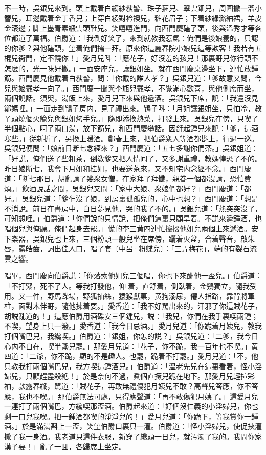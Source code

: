 不一時，吳銀兒來到。頭上戴着白縐紗䯼髻、珠子箍兒、翠雲鈿兒，周圍撇一溜小簪兒，耳邊戴着金丁香兒；上穿白綾對衿襖兒，粧花眉子；下着紗綠潞紬裙，羊皮金滚邊；脚上墨青素緞雲頭鞋兒。笑嘻嘻進門，向西門慶磕了頭，後與溫秀才等各位都道了萬福。伯爵道：「我倒好笑了，來到就教我惹氣：俺們是後娘養的，只認的你爹？與他磕頭，望着俺們擩一拜。原來你這麗春院小娘兒這等欺客！我若有五棍兒衙門，定不饒你！」愛月兒呌：「應花子，好沒羞的孩兒！那裏哥兒你行頭不怎麽的，光一味好撇。」一面安座兒，讓銀姐坐。就在西門慶桌邊坐下，連忙放鍾筯。西門慶見他戴着白䯼髻，問：「你戴的誰人孝？」吳銀兒道：「爹故意又問，今兒與娘戴孝一向了。」西門慶一聞與李瓶兒戴孝，不覺滿心歡喜，與他側席而坐，兩個說話。須臾，湯飯上來，愛月兒下來與他遞酒。吳銀兒下席，說：「我還沒見鄭媽哩。」一面走到鴇子房内，見了禮出來。鴇子呌：「月姐讓銀姐坐，只怕冷，教丫頭燒個火籠兒與銀姐烤手兒。」隨即添換熱菜，打發上來。吳銀兒在傍，只喫了半個點心，呵了兩口湯，放下筯兒，和西門慶攀話。因㧱起鍾兒來說：「爹，這酒寒些。」従新折了，另換上暖酒。鄭春上來，把伯爵衆人等酒都斟上，行過一巡。吳銀兒便問：「娘前日断七念經來？」西門慶道：「五七多謝你們茶。」吳銀姐道：「好説，俺們送了些粗茶，倒敎爹又把人情囘了，又多謝重禮，教媽惶恐了不的。昨日娘断七，我會下月姐和桂姐，也要送茶來，又不知宅内念經不念。」西門慶道：「断七那日，胡亂請了幾衆女僧，在家拜了拜懺，親眷一個都沒請，恐怕費煩。」飲酒說話之間，吳銀兒又問：「家中大娘、衆娘們都好？」西門慶道：「都好。」吳銀兒道：「爹乍沒了娘，到房裏孤孤兒的，心中也想？」西門慶道：「想是不消說。前日在書房中，白日夢見他，哭的我了不的。」吳銀兒道：「熱突突沒了，可知想哩。」伯爵道：「你們說的只情說，把俺們這裏只顧旱着。不説來遞鍾酒，也唱個兒與俺聽。俺們起身去罷。」慌的李三黄四連忙攛掇他姐兒兩個上來遞酒。安下楽器，吳銀兒也上來，三個粉頭一般兒坐在席傍，躧着火盆，合着聲音，啟朱唇，露皓齒，詞出佳人口，唱了套〔中呂·粉蝶兒〕：「三弄梅花」，端的有裂石流雲之響。

唱畢，西門慶向伯爵説：「你落索他姐兒三個唱，你也下來酬他一盃兒。」伯爵道：「不打緊，死不了人。等我打發他，仰𢵞着，直舒着，側臥着，金鷄獨立，隨我受用。又一件，野馬䠕場，野狐抽絲，猿猴獻菓，黄狗溺尿，僊人指路，靠背將軍柱，面對木伴哥，隨他揀着耍。」愛香道：「我不好駡出來的，汗邪了你這賊花子，胡説亂道的！」這應伯爵用酒碟安三個鍾兒，説：「我兒，你們在我手裏喫兩鍾；不喫，望身上只一潑。」愛香道：「我今日忌酒。」愛月兒道：「你跪着月姨兒，教我打個嘴巴兒，我纔喫。」伯爵道：「銀姐，你怎的説？」吳銀兒道：「二爹，我今日心内不自在，喫半盞兒罷。」那愛月兒道：「花子，你不跪，我一百年也不喫。」黄四道：「二爺，你不跪，顯的不是趣人。也罷，跪着不打罷。」愛月兒道：「不，他只教我打兩個嘴巴兒，我方喫這鍾酒兒。」伯爵道：「溫老先兒在這裏看着，怪小淫婦兒，只顧趕盡殺絶！」於是奈何不過，眞個直撅兒跪在地下。那愛月兒輕揎彩袖，款露春纖，駡道：「賊花子，再敢無禮傷犯月姨兒不敢？高聲兒答應，你不答應，我也不喫。」那伯爵無法可處，只得應聲道：「再不敢傷犯月姨了。」這愛月兒一連打了兩個嘴巴，方纔喫那盃酒。伯爵起來道：「好個沒仁義的小淫婦兒，你也剩一口兒我喫。把一鍾酒都喫的淨淨兒的！」愛月兒道：「你跪下，等我賞你一鍾酒。」於是滿滿斟上一盃，笑望伯爵口裏只一灌。伯爵道：「怪小淫婦兒，使促挾灌撒了我一身酒。我老道只這件衣服，新穿了纔頭一日兒，就汚濁了我的。我問你家漢子要！」亂了一囬，各歸席上坐定。

